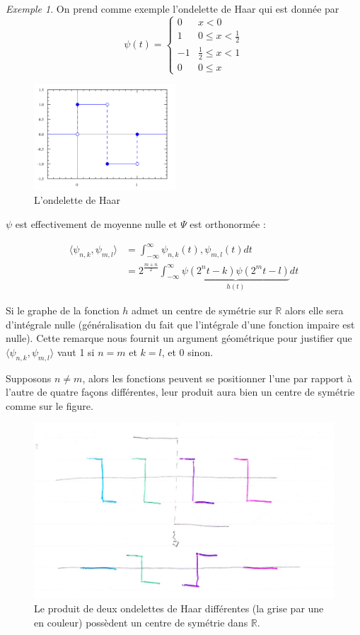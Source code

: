\documentclass[]{article}
\theoremstyle{remark}
\newtheorem{myexmpl}{Exemple}
\theoremstyle{definition}
\begin{document}
	\begin{myexmpl}
		On prend comme exemple l'ondelette de Haar qui est donnée par $$\psi(t) = \left\{
		\begin{array}{cl}
			0 & x < 0 \\
			1 & 0 \leqslant x < \frac{1}{2} \\
			-1 & \frac{1}{2} \leqslant x < 1 \\
			0 & 0 \leqslant x
		\end{array}
		\right.$$
	\end{myexmpl}
	
	\begin{figure}[h]
		\label{Haar}
		\centering
		\includegraphics[width=150pt]{Haar.png}
		\caption{L'ondelette de Haar}
	\end{figure}
	
	$\psi$ est effectivement de moyenne nulle et $\Psi$ est orthonormée :
	
	\begin{align*}
		\langle \psi_{n, k}, \psi_{m, l}\rangle &= \int_{-\infty}^{\infty} \psi_{n, k}(t), \psi_{m, l}(t) dt \\
		&= 2^{\frac{m+n}{2}} \int_{-\infty}^{\infty} \underbrace{\psi(2^nt - k) \psi(2^mt - l)}_{h(t)} dt
	\end{align*}
	
	Si le graphe de la fonction $h$ admet un centre de symétrie sur $\mathbb{R}$ alors elle sera d'intégrale nulle (généralisation du fait que l'intégrale d'une fonction impaire est nulle). Cette remarque nous fournit un argument géométrique pour justifier que $\langle \psi_{n, k}, \psi_{m, l}\rangle$ vaut 1 si $n = m$ et $k = l$, et 0 sinon.
	
	Supposons $n \neq m$, alors les fonctions peuvent se positionner l'une par rapport à l'autre de quatre façons différentes, leur produit aura bien un centre de symétrie comme sur le figure.
		
	\begin{figure}[h]
		\centering
		\includegraphics[width=350pt]{Haar_exemple.png}
		\caption{Le produit de deux ondelettes de Haar différentes  (la grise par une en couleur) possèdent un centre de symétrie dans $\mathbb{R}$.}
	\end{figure}
	
\end{document}
